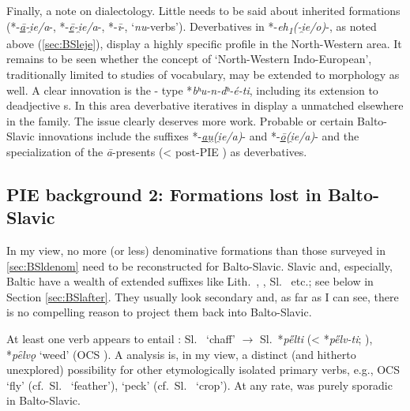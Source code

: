 \documentclass[output=paper,colorlinks,citecolor=brown]{langscibook}
\begin{document}
Finally, a note on dialectology. Little needs to be said about inherited formations (*-\textit{\underline{ā}-i̯e/a}-, *-\textit{\underline{ē}-i̯e/a}-, *-\textit{ī}-, ‘\textit{nu}-verbs’). Deverbatives in *-\textit{eh\textsubscript{1}(-i̯e/o)}-, as noted above (\ref{sec:BSleje}), display a highly specific profile in the North-Western area. It remains to be seen whether the concept of ‘North-Western Indo-European’, traditionally limited to studies of vocabulary, may be extended to morphology as well. A clear  innovation is the - type *\textit{bʰu\nobreakdash-n\nobreakdash-dʰ\nobreakdash-é-ti}, including its extension to deadjective  s. In this area deverbative iteratives in  display a  unmatched elsewhere in the family. The issue clearly deserves more work. Probable or certain Balto-Slavic innovations include the suffixes *-\textit{\underline{au̯}(i̯e/a)}- and *-\textit{\underline{ō}(i̯e/a)}- and the specialization of the \textit{ā}-presents (< post-PIE ) as deverbatives.

\subsection{PIE background 2: Formations lost in Balto-Slavic}
\label{sec:BSlPIElost}

In my view, no more (or less) denominative formations than those surveyed in \ref{sec:BSldenom} need to be reconstructed for Balto-Slavic. Slavic and, especially, Baltic have a wealth of extended suffixes like Lith.\ , , Sl.\  etc.; see below in Section \ref{sec:BSlafter}. They usually look secondary and, as far as I can see, there is no compelling reason to project them back into Balto-Slavic.

At least one verb appears to entail : Sl.\  ‘chaff’ $\rightarrow$ Sl.\ *\textit{p\H{e}lti} (< *\textit{p\H{e}lv-ti}; \citealt[647--648]{Koch1990}), *\textit{pȇlvǫ} ‘weed’ (OCS ). A  analysis is, in my view, a distinct (and hitherto unexplored) possibility for other etymologically isolated primary verbs, e.g., OCS  ‘fly’ (cf.\ Sl.\  ‘feather’),  ‘peck’ (cf.\ Sl.\  ‘crop’). At any rate,  was purely sporadic in Balto-Slavic.
\end{document}
